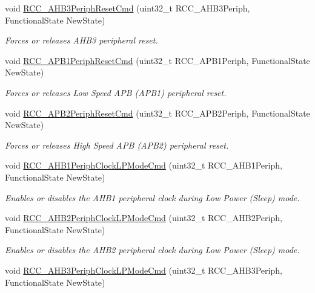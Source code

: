 \begin{DoxyCompactItemize}
void \hyperlink{group___r_c_c___group3_gaee44f159a1ca9ebdd7117bff387cd592}{R\+C\+C\+\_\+\+A\+H\+B3\+Periph\+Reset\+Cmd} (uint32\+\_\+t R\+C\+C\+\_\+\+A\+H\+B3\+Periph, Functional\+State New\+State)
\begin{DoxyCompactList}\small\item\em Forces or releases A\+H\+B3 peripheral reset. \end{DoxyCompactList}\item 
void \hyperlink{group___r_c_c___group3_gab197ae4369c10b92640a733b40ed2801}{R\+C\+C\+\_\+\+A\+P\+B1\+Periph\+Reset\+Cmd} (uint32\+\_\+t R\+C\+C\+\_\+\+A\+P\+B1\+Periph, Functional\+State New\+State)
\begin{DoxyCompactList}\small\item\em Forces or releases Low Speed A\+PB (A\+P\+B1) peripheral reset. \end{DoxyCompactList}\item 
void \hyperlink{group___r_c_c___group3_gad94553850ac07106a27ee85fec37efdf}{R\+C\+C\+\_\+\+A\+P\+B2\+Periph\+Reset\+Cmd} (uint32\+\_\+t R\+C\+C\+\_\+\+A\+P\+B2\+Periph, Functional\+State New\+State)
\begin{DoxyCompactList}\small\item\em Forces or releases High Speed A\+PB (A\+P\+B2) peripheral reset. \end{DoxyCompactList}\item 
void \hyperlink{group___r_c_c___group3_ga5cd0d5adbc7496d7005b208bd19ce255}{R\+C\+C\+\_\+\+A\+H\+B1\+Periph\+Clock\+L\+P\+Mode\+Cmd} (uint32\+\_\+t R\+C\+C\+\_\+\+A\+H\+B1\+Periph, Functional\+State New\+State)
\begin{DoxyCompactList}\small\item\em Enables or disables the A\+H\+B1 peripheral clock during Low Power (Sleep) mode. \end{DoxyCompactList}\item 
void \hyperlink{group___r_c_c___group3_ga1ac5bb9676ae9b48e50d6a95de922ce3}{R\+C\+C\+\_\+\+A\+H\+B2\+Periph\+Clock\+L\+P\+Mode\+Cmd} (uint32\+\_\+t R\+C\+C\+\_\+\+A\+H\+B2\+Periph, Functional\+State New\+State)
\begin{DoxyCompactList}\small\item\em Enables or disables the A\+H\+B2 peripheral clock during Low Power (Sleep) mode. \end{DoxyCompactList}\item 
void \hyperlink{group___r_c_c___group3_ga4e1df07cdfd81c068902d9d35fcc3911}{R\+C\+C\+\_\+\+A\+H\+B3\+Periph\+Clock\+L\+P\+Mode\+Cmd} (uint32\+\_\+t R\+C\+C\+\_\+\+A\+H\+B3\+Periph, Functional\+State New\+State)

\end{DoxyCompactItemize}
